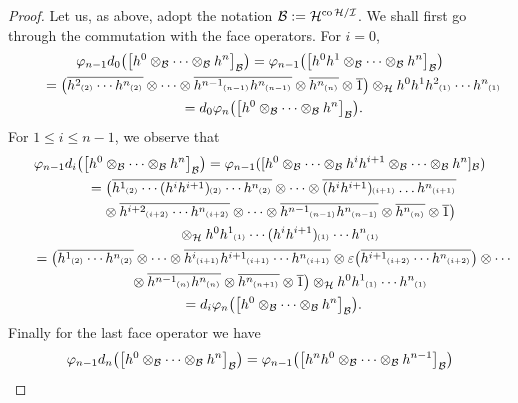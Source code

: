 \documentclass[pdftex]{sigma}
\numberwithin{equation}{section}
\DeclareMathOperator{\co}{co}
\newcommand{\ps}[1]{~\hspace{-4pt}_{^{(#1)}}}
\newcommand{\wbar}[1]{\overline{#1}}
\begin{document}
\begin{proof}
Let us, as above, adopt the notation ${\cal B}:={\cal H}^{\co{\cal H}/{\cal I}}$.
We shall f\/irst go through the commutation with the face operators.
For $i=0$,
\begin{gather*}
\varphi_{n-1}d_0\big(\big[h^0\otimes_{\cal B}\cdots\otimes_{\cal B} h^n\big]_{\cal B}\big) =\varphi_{n-1}\big(\big[h^0h^1\otimes_{\cal
B}\cdots\otimes_{\cal B} h^n\big]_{\cal B}\big)
\\
\qquad
=\big(\wbar{h^2\ps{2}\cdots h^n\ps{2}} \otimes\cdots\otimes \wbar{h^{n-1}\ps{n-1}h^n\ps{n-1}} \otimes \wbar{h^n\ps{n}}
\otimes \wbar{1}\big) \otimes_{\cal H} h^0h^1h^2\ps{1}\cdots h^n\ps{1}
\\
\qquad
=d_0\varphi_{n}\big(\big[h^0\otimes_{\cal B}\cdots\otimes_{\cal B} h^n\big]_{\cal B}\big).
\end{gather*}
For $1\leq i \leq n-1$, we observe that
\begin{gather*}
\varphi_{n-1}d_i\big(\big[h^0\otimes_{\cal B}\cdots\otimes_{\cal B} h^n\big]_{\cal B}\big) =\varphi_{n-1}([h^0\otimes_{\cal
B}\cdots\otimes_{\cal B} h^ih^{i+1}\otimes_{\cal B}\cdots\otimes_{\cal B} h^n]_{\cal B})
\\
\qquad
=\big(\wbar{h^1\ps{2}\cdots(h^ih^{i+1})\ps{2}\cdots h^n\ps{2}} \otimes\cdots\otimes \wbar{(h^ih^{i+1})\ps{i+1}\dots
h^n\ps{i+1}}
\\
\qquad
\phantom{=}{}\otimes\wbar{h^{i+2}\ps{i+2}\cdots h^n\ps{i+2}}\otimes\cdots
\otimes\wbar{h^{n-1}\ps{n-1}h^n\ps{n-1}} \otimes \wbar{h^n\ps{n}} \otimes \wbar{1}\big)\\
\qquad
\phantom{=}{}
 \otimes_{\cal H}
h^0h^1\ps{1}\cdots(h^ih^{i+1})\ps{1}\cdots h^n\ps{1}
\\
\qquad
=\big(\wbar{h^1\ps{2}\cdots h^n\ps{2}} \otimes\cdots\otimes \wbar{h^i\ps{i+1}h^{i+1}\ps{i+1}\cdots h^n\ps{i+1}}\otimes
\varepsilon\big(\wbar{h^{i+1}\ps{i+2}\cdots h^n\ps{i+2}}\big) \otimes\cdots
\\
\qquad
\phantom{=}{}
\otimes \wbar{h^{n-1}\ps{n}h^n\ps{n}} \otimes \wbar{h^n\ps{n+1}} \otimes \wbar{1}\big) \otimes_{\cal H}
h^0h^1\ps{1}\cdots h^n\ps{1}
\\
\qquad
=d_i\varphi_{n}\big(\big[h^0\otimes_{\cal B}\cdots\otimes_{\cal B} h^n\big]_{\cal B}\big).
\end{gather*}
Finally for the last face operator we have
\begin{gather*}
\varphi_{n-1}d_n\big(\big[h^0\otimes_{\cal B}\cdots\otimes_{\cal B} h^n\big]_{\cal B}\big) =\varphi_{n-1}\big(\big[h^nh^0\otimes_{\cal
B}\cdots\otimes_{\cal B} h^{n-1}\big]_{\cal B}\big)

\end{gather*}
\end{proof}
\end{document}
